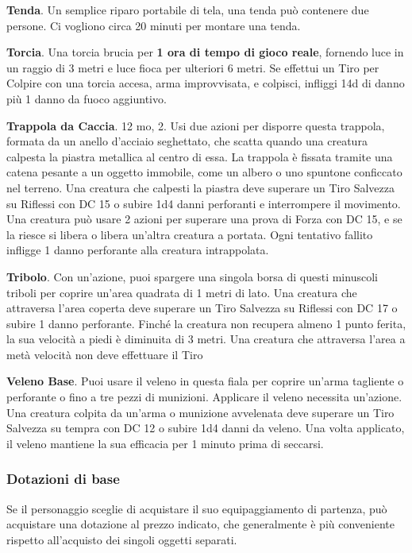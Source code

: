 \documentclass[12pt,a4paper,twoside,openany]{book}
\begin{document}
\begin{multicols}{2}
\textbf{Tenda}. Un semplice riparo portabile di tela, una tenda può contenere due persone. Ci vogliono circa 20 minuti per montare una tenda.

\textbf{Torcia}. Una torcia brucia per \textbf{1 ora di tempo di gioco reale}, fornendo luce in un raggio di 3 metri e luce fioca per ulteriori 6 metri. Se effettui un Tiro per Colpire con una torcia accesa, arma improvvisata, e colpisci, infliggi 14d di danno più 1 danno da fuoco aggiuntivo. 

\textbf{Trappola da Caccia}. 12 mo, 2. Usi due azioni per disporre questa trappola, formata da un anello d’acciaio seghettato, che scatta quando una creatura calpesta la piastra metallica al centro di essa. La trappola è fissata tramite una catena pesante a un oggetto immobile, come un albero o uno spuntone conficcato nel terreno. Una creatura che calpesti la piastra deve superare un Tiro Salvezza su Riflessi con DC 15 o subire 1d4 danni perforanti e interrompere il movimento. Una creatura può usare 2 azioni per superare una prova di Forza con DC 15, e se la riesce si libera o libera un’altra creatura a portata. Ogni tentativo fallito infligge 1 danno perforante alla creatura intrappolata.


\textbf{Tribolo}. Con un’azione, puoi spargere una singola borsa di questi minuscoli triboli per coprire un’area quadrata di 1 metri di lato. Una creatura che attraversa l’area coperta deve superare un Tiro Salvezza su Riflessi con DC 17 o subire 1 danno perforante. Finché la creatura non recupera almeno 1 punto ferita, la sua velocità a piedi è diminuita di 3 metri. Una creatura che attraversa l’area a metà velocità non deve effettuare il Tiro 

\textbf{Veleno Base}. Puoi usare il veleno in questa fiala per coprire un’arma tagliente o perforante o fino a tre pezzi di munizioni. Applicare il veleno necessita un’azione. Una creatura colpita da un’arma o munizione avvelenata deve superare un Tiro Salvezza su tempra con DC 12 o subire 1d4 danni da veleno.
Una volta applicato, il veleno mantiene la sua efficacia per 1 minuto prima di seccarsi.

\subsubsection{Dotazioni di base}
Se il personaggio sceglie di acquistare il suo equipaggiamento di partenza, può acquistare una dotazione al prezzo indicato, che generalmente è più conveniente rispetto all'acquisto dei singoli oggetti separati.


\end{multicols}
\end{document}

